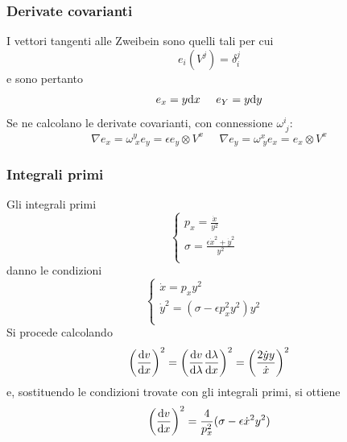 \subsubsection*{Derivate covarianti}
I vettori tangenti alle Zweibein sono quelli tali per cui
\[ e_i(V^j) = \delta_i^j \]
e sono pertanto
\[ e_x = y \mathrm{d} x \;\;\;\;\; e_Y = y\mathrm{d} y \]
Se ne calcolano le derivate covarianti, con connessione $\omega^i_{\;j}$:
\[ \nabla e_x = \omega^y_{\;x} e_y = \epsilon e_y \otimes V^x \;\;\;\;\; \nabla e_y = \omega^x_{\;y} e_x =  e_x \otimes V^x \]



\subsubsection*{Integrali primi}
Gli integrali primi
\[ \begin{cases}
	p_x = \frac{\dot{x}}{y^2} & \\
	\sigma = \frac{\epsilon\dot{x}^2 + \dot{y}^2}{y^2} & \\
  \end{cases}
\]
danno le condizioni
\[ \begin{cases}
	\dot{x} = p_x y^2 & \\
	\dot{y}^2 = (\sigma - \epsilon p_x^2 y^2 ) y^2 & \\
  \end{cases}
\]
Si procede calcolando
\[ \left(\frac{\mathrm{d} v}{\mathrm{d} x}\right)^2 = \left( \frac{\mathrm{d} v}{\mathrm{d} \lambda} \frac{\mathrm{d} \lambda}{\mathrm{d} x}  \right)^2 
	= \left( \frac{2\dot{y}y}{\dot{x}} \right)^2 \]
e, sostituendo le condizioni trovate con gli integrali primi, si ottiene
\[ \left(\frac{\mathrm{d} v}{\mathrm{d} x}\right)^2 = \frac{4}{p_x^2} (\sigma - \epsilon\dot{x}^2 y^2 )\]

